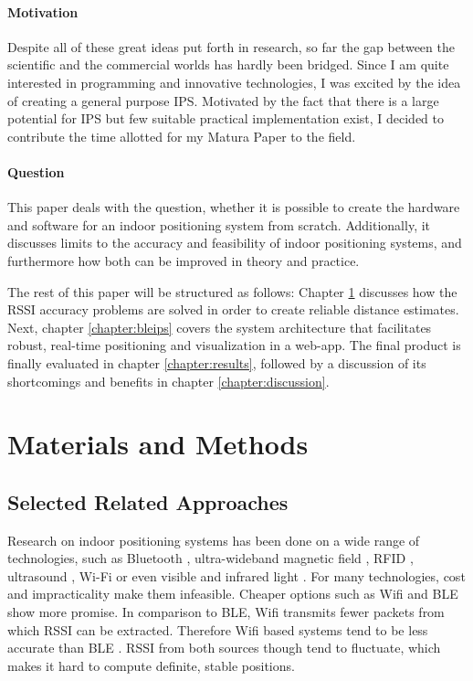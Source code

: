 \documentclass[a4paper, oneside]{ipsreport}
\begin{document}
\subsubsection{Motivation}
Despite all of these great ideas put forth in research, so far the gap between the scientific and the commercial worlds has hardly been bridged. Since I am quite interested in programming and innovative technologies, I was excited by the idea of creating a general purpose IPS. Motivated by the fact that there is a large potential for IPS but few suitable practical implementation exist, I decided to contribute the time allotted for my Matura Paper to the field.

\subsubsection{Question}
This paper deals with the question, whether it is possible to create the hardware and software for an indoor positioning system from scratch. Additionally, it discusses limits to the accuracy and feasibility of indoor positioning systems, and furthermore how both can be improved in theory and practice.

The rest of this paper will be structured as follows: Chapter \ref{chapter:materialsAndMethods} discusses how the RSSI accuracy problems are solved in order to create reliable distance estimates. Next, chapter \ref{chapter:bleips} covers the system architecture that facilitates robust, real-time positioning and visualization in a web-app. The final product is finally evaluated in chapter \ref{chapter:results}, followed by a discussion of its shortcomings and benefits in chapter \ref{chapter:discussion}.

\chapter{Materials and Methods}
\label{chapter:materialsAndMethods}

\section{Selected Related Approaches}
\label{section:relatedWork}

Research on indoor positioning systems has been done on a wide range of technologies, such as Bluetooth \cite{BLE}, ultra-wideband \cite{UWB} magnetic field \cite{Magnetic}, RFID \cite{RFID}, ultrasound \cite{Ultrasound}, Wi-Fi \cite{IPSESP32Client} or even visible and infrared light \cite{visiblelight}. For many technologies, cost and impracticality make them infeasible. Cheaper options such as  Wifi and BLE show more promise. In comparison to BLE, Wifi transmits fewer packets from which RSSI can be extracted. Therefore Wifi based systems tend to be less accurate than BLE \cite{IPSESP32Client}. RSSI from both sources though tend to fluctuate, which makes it hard to compute definite, stable positions.
\end{document}
